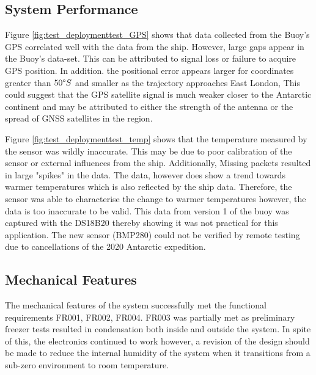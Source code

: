 \subsection{System Performance}

Figure \ref{fig:test_deploymenttest_GPS} shows that data collected from the Buoy's GPS correlated well with the data from the ship. However, large gaps appear in the Buoy's data-set. This can be attributed to signal loss or failure to acquire GPS position. In addition. the positional error appears larger for coordinates greater than $50\degree S$ and smaller as the trajectory approaches East London, This could suggest that the GPS satellite signal is much weaker closer to the Antarctic continent and may be attributed to either the strength of the antenna or the spread of GNSS satellites in the region.

Figure \ref{fig:test_deploymenttest_temp} shows that the temperature measured by the sensor was wildly inaccurate. This may be due to poor calibration of the sensor or external influences from the ship. Additionally, Missing packets resulted in large "spikes" in the data. The data, however does show a trend towards warmer temperatures which is also reflected by the ship data. Therefore, the sensor was able to characterise the change to warmer temperatures however, the data is too inaccurate to be valid. This data from version 1 of the buoy was captured with the DS18B20 thereby showing it was not practical for this application. The new sensor (BMP280) could not be verified by remote testing due to cancellations of the 2020 Antarctic expedition.

\subsection{Mechanical Features}

The mechanical features of the system successfully met the functional requirements FR001, FR002, FR004. FR003 was partially met as preliminary freezer tests resulted in condensation both inside and outside the system. In spite of this, the electronics continued to work however, a revision of the design should be made to reduce the internal humidity of the system when it transitions from a sub-zero environment to room temperature. \par 

